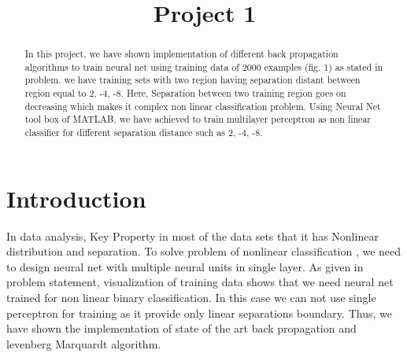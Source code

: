 \documentclass[conference]{IEEEtran}
\begin{document}
\title{Project 1}

\author{
	\and
{}
\and	
{}
	
	
}


\maketitle


\begin{abstract}
 In this project, we have shown implementation of  different back propagation algorithms to train neural net using training data of 2000 examples (fig. 1) as stated in problem. we have training sets with two region having separation distant between region equal to 2, -4, -8. Here, Separation between two training region goes on decreasing which makes it complex non linear classification problem. Using Neural Net tool box of MATLAB, we have achieved to train multilayer perceptron as non linear classifier for different separation distance such as 2, -4, -8.
\end{abstract}


\section{Introduction}

In data analysis, Key Property in most of the data sets that it has Nonlinear distribution and separation. To solve problem of nonlinear classification \cite{ol}, we need to design neural net with multiple neural units in single layer. As given in problem statement, visualization of training data shows that we need neural net trained for  non linear binary classification. In this case we can not use single perceptron for training as it provide only linear separations boundary. Thus, we have shown the implementation of state of the art back propagation and levenberg Marquardt algorithm.
\end{document}
